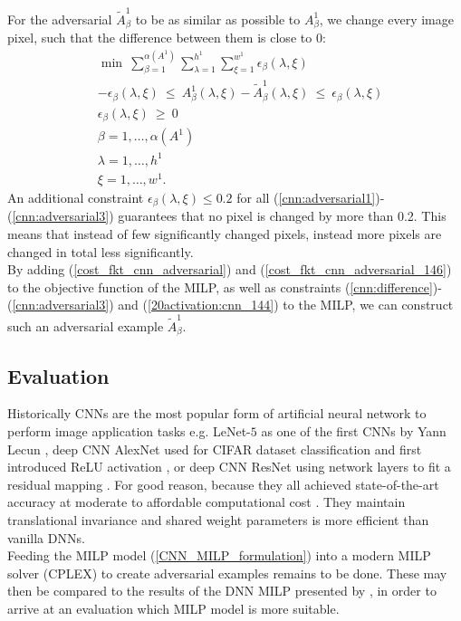 \documentclass{article}
\begin{document}
{For the adversarial $\tilde{A}_\beta^1$ to be as similar as possible to $A_\beta^1$, we change every image pixel, such that the difference between them is close to $0$:
\begin{align} 
&\min \ \sum_{\beta=1}^{\alpha(A^1)} \sum_{\lambda=1}^{h^1} \sum_{\xi=1}^{w^1} \epsilon_\beta(\lambda, \xi) \label{cost_fkt_cnn_adversarial_146} \\
& -\epsilon_\beta(\lambda, \xi) \ \leq \ A_\beta^1(\lambda, \xi) - \tilde{A}_\beta^1(\lambda, \xi) \ \leq \ \epsilon_\beta(\lambda, \xi) \label{cnn:difference} \\
&\epsilon_\beta(\lambda, \xi) \ \geq \ 0 \\
&\beta=1, \ldots, \alpha(A^1) \label{cnn:adversarial1}\\
&\lambda = 1, \ldots, h^1 \label{cnn:adversarial2} \\
&\xi = 1, \ldots, w^1. \label{cnn:adversarial3}
\end{align}
An additional constraint $\epsilon_\beta(\lambda, \xi) \leq 0.2$ for all (\ref{cnn:adversarial1})-(\ref{cnn:adversarial3}) guarantees that no pixel is changed by more than 0.2. This means that instead of few significantly changed pixels, instead more pixels are changed in total less significantly.\\
By adding (\ref{cost_fkt_cnn_adversarial}) and (\ref{cost_fkt_cnn_adversarial_146}) to the objective function of the MILP, as well as constraints (\ref{cnn:difference})-(\ref{cnn:adversarial3}) and (\ref{20activation:cnn_144}) to the MILP, we can construct such an adversarial example $\tilde{A}_\beta^1$.

\subsection{Evaluation}

Historically CNNs are the most popular form of artificial neural network to perform image application tasks e.g. LeNet-$5$ \cite{yann} as one of the first CNNs by Yann Lecun \cite{yann89}, deep CNN AlexNet \cite{cifar100} used for CIFAR dataset classification and first introduced ReLU activation \cite{cs231:optimizers}, or deep CNN ResNet \cite{resnet50} using network layers to fit a residual mapping \cite{cs231:optimizers}. For good reason, because they all achieved state-of-the-art accuracy at moderate to affordable computational cost \cite{cs231:optimizers}. They maintain translational invariance and shared weight parameters is more efficient than vanilla DNNs.\\
Feeding the MILP model (\ref{CNN_MILP_formulation}) into a modern MILP solver (CPLEX) to create adversarial examples remains to be done. These may then be compared to the results of the DNN MILP presented by \cite{fischetti17}, in order to arrive at an evaluation which MILP model is more suitable. 





}
\end{document}
